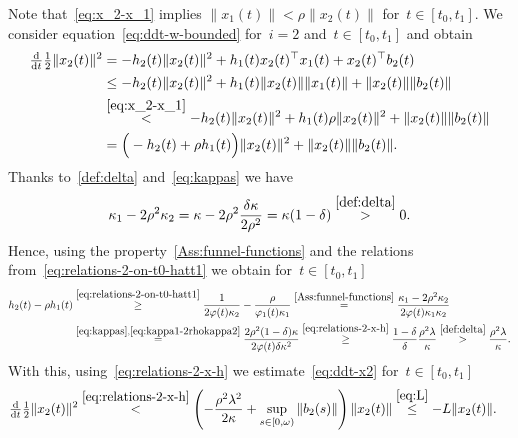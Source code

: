 \documentclass[ envcountsect, envcountsame]{svjour3}
\newcommand{\ddt}{\tfrac{\text{\normalfont d}}{\text{\normalfont d}t}}
\newcommand{\vp}{\varphi}
\begin{document}
%
Note that~\eqref{eq:x_2-x_1} implies $\|x_1(t)\| < \rho \|x_2(t)\|$ for~$t \in [t_0, t_1]$.
We consider equation~\eqref{eq:ddt-w-bounded} for~$i=2$ and~$t \in [t_0, t_1]$ and obtain
\begin{equation} \label{eq:ddt-x2}
\begin{aligned}
\ddt \tfrac{1}{2} \| x_{2}(t)\|^2 &= -h_2(t) \| x_{2}(t)\|^2 + h_{1}(t) x_{2}(t)^\top x_{1}(t) + x_{2}(t)^\top b_2(t) \\
& \le -h_2(t) \| x_{2}(t)\|^2 +  h_{1}(t) \|x_{2}(t)\| \|x_{1}(t)\| + \|x_{2}(t)\| \|b_2(t)\| \\
& \overset{\eqref{eq:x_2-x_1}}{< } -h_2(t) \| x_{2}(t)\|^2 +  h_{1}(t) \rho \|x_{2}(t)\|^2  + \|x_{2}(t)\| \|b_2(t)\| \\
& = \Big(- h_2(t) + \rho h_{1}(t) \Big) \|x_2(t)\|^2    + \|x_{2}(t)\| \|b_2(t)\|.
\end{aligned}
\end{equation}
%
Thanks to~\eqref{def:delta} and~\eqref{eq:kappas} we have
\begin{equation} \label{eq:kappa1-2rhokappa2}
\kappa_1 - 2\rho^2 \kappa_2 = \kappa - 2 \rho^2 \frac{ \delta \kappa}{2\rho^2} = \kappa (1-\delta) \overset{\eqref{def:delta}}{>} 0. 
%
\end{equation}
%
Hence, using the property~\ref{Ass:funnel-functions} and the relations from~\eqref{eq:relations-2-on-t0-hatt1} we obtain for~$t \in [ t_0,  t_1]$ 
\begin{equation*}
\begin{aligned}
h_{2}(t)- \rho h_{1}(t) 
& \overset{\eqref{eq:relations-2-on-t0-hatt1}}{\ge}  \frac{1}{2  \vp(t) \kappa_2} - \frac{\rho}{\vp_1(t) \kappa_1}  
\overset{\rm \ref{Ass:funnel-functions}}{=} \frac{\kappa_1 - 2 \rho^2 \kappa_2}{2 \vp(t) \kappa_1 \kappa_2}  \\
&\overset{\eqref{eq:kappas},\eqref{eq:kappa1-2rhokappa2}}{=} \frac{2 \rho^2 (1-\delta) \kappa}{2 \vp(t) \delta \kappa^2 } 
\overset{\eqref{eq:relations-2-x-h}}{\ge} \frac{1-\delta}{\delta} \frac{ \rho^2 \lambda}{ \kappa} 
\overset{\eqref{def:delta}}{>} \frac{\rho^2 \lambda}{\kappa} .
%
\end{aligned}
\end{equation*}
With this, using~\eqref{eq:relations-2-x-h} we estimate~\eqref{eq:ddt-x2} for~$t \in [ t_0, t_1]$
\begin{equation*}
\begin{aligned}
\ddt \tfrac{1}{2} \| x_{2}(t)\|^2 & \overset{\eqref{eq:relations-2-x-h}}{< }\left( - \frac{ \rho^2 \lambda^2}{2 \kappa} + \sup_{s \in [0,\omega)}  \|b_2(s)\| \right) \|x_2(t)\|
\overset{\eqref{eq:L}}{\le} -  L \|x_2(t)\|.
\end{aligned}
\end{equation*}
\end{document}
